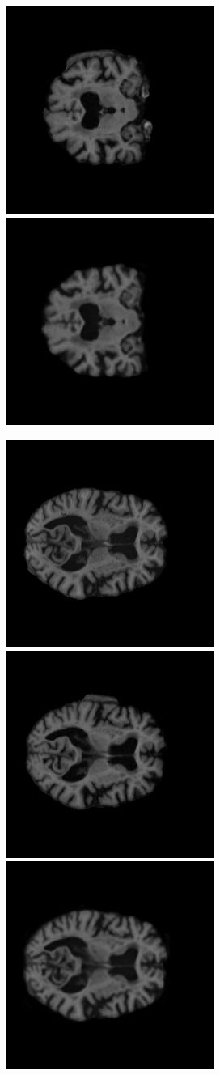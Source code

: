 \documentclass[12pt, fleqn, titlepage]{article}
\newcommand\skipperer{0.45pt}
\newcommand\ripperer{1.25pt}
\newcommand\bigskipx{2.1pt}
\newcommand{\1}[1]{\mathds{1}\left[#1\right]}
\begin{document}
\begin{figure}[H]
\begin{subfigure}[b]{0.7\textwidth}
		\hskip\skipperer
		\hskip\bigskipx
		\includegraphics[width=0.22\linewidth]{imgs/082_S_0469/082_S_0469_xy_1.5_GT}
		\hskip\skipperer
		\includegraphics[width=0.22\linewidth]{imgs/082_S_0469/ALL_model_082_S_0469_xy_3}
	\end{subfigure}
	\vskip\ripperer
	\begin{subfigure}[b]{0.7\textwidth}
		\centering
		\includegraphics[width=0.22\linewidth]{imgs/082_S_0469/082_S_0469_xz_3_GT}
		\hskip\skipperer
		\hskip\bigskipx
		\includegraphics[width=0.22\linewidth]{imgs/082_S_0469/082_S_0469_xz_1.5_GT}
		\hskip\skipperer
		\includegraphics[width=0.22\linewidth]{imgs/082_S_0469/ALL_model_082_S_0469_xz_3}
	\end{subfigure}
	\vskip\ripperer
	\begin{subfigure}[b]{0.7\textwidth}

\end{subfigure}
\end{figure}
\end{document}
